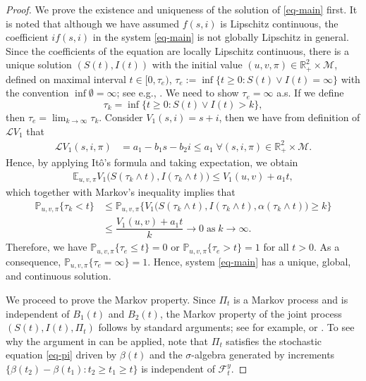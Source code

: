 \documentclass[12pt]{amsart}
\theoremstyle{remark}
\numberwithin{equation}{section}
\newcommand{\M}{\mathcal{M}}
\newcommand{\F}{\mathcal{F}}
\newcommand{\E}{\mathbb{E}}
\newcommand{\PP}{\mathbb{P}}
\newcommand{\R}{\mathbb{R}}
\newcommand{\Lom}{\mathcal{L}}
\numberwithin{equation}{section}
\newcommand{\PPi}{\PP_{u,v,\pi}}
\newcommand{\Ei}{\E_{u,v,\pi}}
\newcommand{\1}{\boldsymbol{1}}
\begin{document}
\begin{proof}
	We prove the existence and uniqueness of the solution of \eqref{eq-main} first.
It is noted that although we have assumed $f(s,i)$ is Lipschitz continuous, the coefficient $if(s,i)$ in the system \eqref{eq-main} is not globally Lipschitz in general.
Since the coefficients of the equation are locally Lipschitz continuous, there is a unique solution $(S(t),I(t))$ with the  initial value $(u,v,\pi)\in \R_+^{2}\times\M$, defined on maximal interval  $t\in [0,\tau_e)$, $\tau_e:=\inf\{t\geq 0: S(t)\vee I(t)=\infty\}$ with the convention $\inf\emptyset=\infty$; see e.g., \cite[Theorem 3.8 and Remark 3.10]{MAO06}.
We need to show $\tau_e=\infty$ a.s.
   If we define
$$\tau_k=\inf\Big\{t\geq 0: S(t)\vee I(t)>k\Big\},$$
then $\tau_e=\lim_{k\to\infty}\tau_k$.
Consider $V_1(s,i)=s+i$, then
 we have from definition of $\Lom V_1$
 that
$$
\begin{aligned}
\Lom V_1(s,i,\pi)&=a_1-b_1s-b_2i
\leq a_1\;\forall (s,i,\pi)\in\R^2_+\times\M.
\end{aligned}
$$
Hence, by applying It\^o's formula and taking expectation, we obtain
$$
\begin{aligned}
\Ei V_1\big(S(\tau_k\wedge t), I(\tau_k\wedge t)\big)
\leq V_1(u,v)+a_1t,
\end{aligned}
$$
which together with Markov's inequality implies that
$$
\begin{aligned}
\PPi\big\{\tau_k<t\big\}&\leq \PPi\Big\{ V_1\big(S(\tau_k\wedge t), I(\tau_k\wedge t),\alpha(\tau_k\wedge t)\big)\geq k\Big\}
\\&\leq \dfrac{ V_1(u,v)+a_1t}{k}\to 0\;\text{as}\;k\to\infty.
\end{aligned}
$$
Therefore, we have $\PPi\{\tau_e\leq t\}=0$ or $\PPi\{\tau_e>t\}=1$ for all $t>0$. As a consequence, $\PPi\{\tau_e=\infty\}=1$. Hence,  system \eqref{eq-main} has a unique, global, and continuous solution.



We proceed
 to prove the Markov property. Since $\Pi_t$ is a Markov process and is independent of $B_1(t)$  and $B_2(t)$, the Markov property of the joint process $(S(t),I(t),\Pi_t)$ follows by standard arguments; see
for example,
\cite[Theorem 3.27 and Lemma 3.2]{MAO06} or \cite[Lemma 6.1]{FFK72}. To see why the argument in \cite{MAO06} can be applied,
note that $\Pi_t$ satisfies the stochastic equation \eqref{eq-pi} driven by $\beta(t)$ and the $\sigma$-algebra generated by increments $\{\beta(t_2)-\beta(t_1):t_2\geq t_1\geq t\}$ is independent of $\F_t^y$.
\end{proof}
\end{document}
